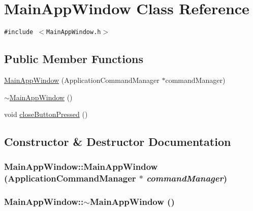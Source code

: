 \hypertarget{class_main_app_window}{
\section{MainAppWindow Class Reference}
\label{class_main_app_window}
}
{\tt \#include $<$MainAppWindow.h$>$}

\subsection*{Public Member Functions}
\begin{CompactItemize}
\item 
\hyperlink{class_main_app_window_b47bf0fbfe999794f13f995b5b4eaa40}{MainAppWindow} (ApplicationCommandManager $\ast$commandManager)
\item 
\hyperlink{class_main_app_window_21c0964a8b0990419d4fe58ea3c45166}{$\sim$MainAppWindow} ()
\item 
void \hyperlink{class_main_app_window_96799c0426d41f555f1b9745144b4092}{closeButtonPressed} ()
\end{CompactItemize}


\subsection{Constructor \& Destructor Documentation}
\hypertarget{class_main_app_window_b47bf0fbfe999794f13f995b5b4eaa40}{
\subsubsection[{MainAppWindow}]{\setlength{\rightskip}{0pt plus 5cm}MainAppWindow::MainAppWindow (ApplicationCommandManager $\ast$ {\em commandManager})}}
\label{class_main_app_window_b47bf0fbfe999794f13f995b5b4eaa40}


\hypertarget{class_main_app_window_21c0964a8b0990419d4fe58ea3c45166}{
\subsubsection[{$\sim$MainAppWindow}]{\setlength{\rightskip}{0pt plus 5cm}MainAppWindow::$\sim$MainAppWindow ()}}
\label{class_main_app_window_21c0964a8b0990419d4fe58ea3c45166}




